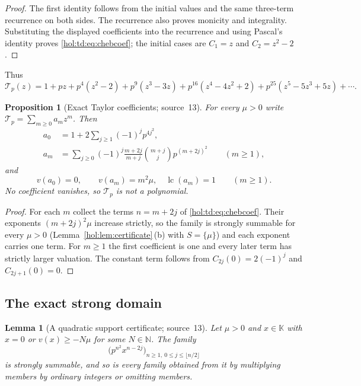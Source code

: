 \documentclass[11pt]{article}
\numberwithin{equation}{section}
\newtheorem{lemma}[theorem]{Lemma}
\newtheorem{proposition}[theorem]{Proposition}
\theoremstyle{definition}
\theoremstyle{remark}
\newcommand{\N}{\mathbb N}
\newcommand{\lc}{\operatorname{lc}}
\newcommand{\KK}{\mathbb K}
\begin{document}
\begin{proof}
The first identity follows from the initial values and the same three-term
recurrence on both sides. The recurrence also proves monicity and
integrality. Substituting the displayed coefficients into the recurrence and
using Pascal's identity proves \eqref{hol:td:eq:chebcoef}; the initial cases
are $C_1=z$ and $C_2=z^2-2$.
\end{proof}

Thus
\[
 \mathcal T_p(z)=1+pz+p^4(z^2-2)+p^9(z^3-3z)+p^{16}(z^4-4z^2+2)
 +p^{25}(z^5-5z^3+5z)+\cdots.
\]

\begin{proposition}[Exact Taylor coefficients; source~13]
\label{hol:td:prop:coeff}
For every $\mu>0$ write $\mathcal T_p=\sum_{m\ge0}a_mz^m$. Then
\begin{align}
 a_0&=1+2\sum_{j\ge1}(-1)^jp^{4j^2},\label{hol:td:eq:a0}\\
 a_m&=\sum_{j\ge0}(-1)^j\frac{m+2j}{m+j}\binom{m+j}{j}p^{(m+2j)^2}
 \qquad(m\ge1),\label{hol:td:eq:am}
\end{align}
and
\begin{equation}\label{hol:td:eq:coeffval}
 v(a_0)=0,\qquad v(a_m)=m^2\mu,\quad\lc(a_m)=1\qquad(m\ge1).
\end{equation}
No coefficient vanishes, so $\mathcal T_p$ is not a polynomial.
\end{proposition}

\begin{proof}
For each $m$ collect the terms $n=m+2j$ of \eqref{hol:td:eq:chebcoef}. Their
exponents $(m+2j)^2\mu$ increase strictly, so the family is strongly summable
for every $\mu>0$ (Lemma~\ref{hol:lem:certificate}\,(b) with $S=\{\mu\}$) and
each exponent carries one term. For $m\ge1$ the first coefficient is one and
every later term has strictly larger valuation. The constant term follows from
$C_{2j}(0)=2(-1)^j$ and $C_{2j+1}(0)=0$.
\end{proof}

\subsection{The exact strong domain}\label{hol:td:sub:domain}

\begin{lemma}[A quadratic support certificate; source~13]
\label{hol:td:lem:quadratic}
Let $\mu>0$ and $x\in\KK$ with $x=0$ or $v(x)\ge-N\mu$ for some $N\in\N$. The
family
\[
 \bigl(p^{n^2}x^{n-2j}\bigr)_{n\ge1,\ 0\le j\le\lfloor n/2\rfloor}
\]
is strongly summable, and so is every family obtained from it by multiplying
members by ordinary integers or omitting members.
\end{lemma}
\end{document}
